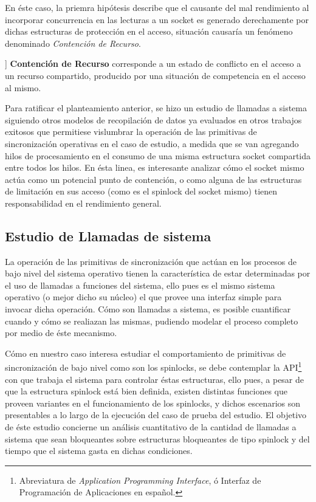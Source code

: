 En éste caso, la priemra hipótesis describe que el causante del mal rendimiento al incorporar concurrencia en las lecturas a un socket es generado derechamente por dichas estructuras de protección en el acceso, situación causaría un fenómeno denominado \emph{Contención de Recurso}.

\begin{defn}[ver [PENDIENTE]] \textbf{Contención de Recurso} corresponde a un estado de conflicto en el acceso a un recurso compartido, producido por una situación de competencia en el acceso al mismo.
\end{defn}

Para ratificar el planteamiento anterior, se hizo un estudio de llamadas a sistema siguiendo otros modelos de recopilación de datos ya evaluados en otros trabajos exitosos \cite{slides:hpPerf} que permitiese vislumbrar la operación de las primitivas de sincronización operativas en el caso de estudio, a medida que se van agregando hilos de procesamiento en el consumo de una misma estructura socket compartida entre todos los hilos. En ésta linea, es interesante analizar cómo el socket mismo actúa como un potencial punto de contención, o como alguna de las estructuras de limitación en sus acceso (como es el spinlock del socket mismo) tienen responsabilidad en el rendimiento general.

\subsection{Estudio de Llamadas de sistema}

La operación de las primitivas de sincronización que actúan en los procesos de bajo nivel del sistema operativo tienen la característica de estar determinadas por el uso de llamadas a funciones del sistema, ello pues es el mismo sistema operativo (o mejor dicho su núcleo) el que provee una interfaz simple para invocar dicha operación. Cómo son llamadas a sistema, es posible cuantificar cuando y cómo se realiazan las mismas, pudiendo modelar el proceso completo por medio de éste mecanismo.

Cómo en nuestro caso interesa estudiar el comportamiento de primitivas de sincronización de bajo nivel como son los spinlocks, se debe contemplar la API\footnote{Abreviatura de \emph{Application Programming Interface}, ó Interfaz de Programación de Aplicaciones en español.} con que trabaja el sistema para controlar éstas estructuras, ello pues, a pesar de que la estructura spinlock está bien definida, existen distintas funciones que proveen variantes en el funcionamiento de los spinlocks, y dichos escenarios son presentables a lo largo de la ejecución del caso de prueba del estudio. El objetivo de éste estudio concierne un análisis cuantitativo de la cantidad de llamadas a sistema que sean bloqueantes sobre estructuras bloqueantes de tipo spinlock y del tiempo que el sistema gasta en dichas condiciones.

